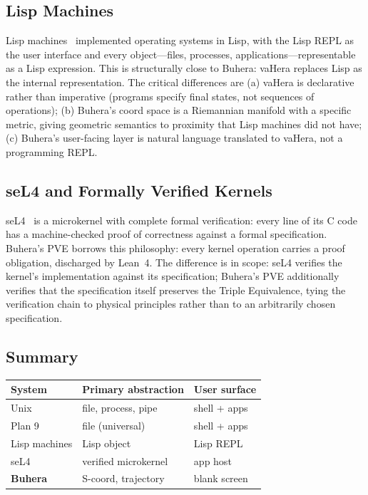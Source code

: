 \documentclass[11pt,twocolumn,a4paper]{article}
\begin{document}
\subsection{Lisp Machines}
Lisp machines~\cite{knight1974cons,bawden1977lisp} implemented operating systems in Lisp, with the Lisp REPL as the user interface and every object---files, processes, applications---representable as a Lisp expression. This is structurally close to Buhera: vaHera replaces Lisp as the internal representation. The critical differences are (a) vaHera is declarative rather than imperative (programs specify final states, not sequences of operations); (b) Buhera's coord space is a Riemannian manifold with a specific metric, giving geometric semantics to proximity that Lisp machines did not have; (c) Buhera's user-facing layer is natural language translated to vaHera, not a programming REPL.

\subsection{seL4 and Formally Verified Kernels}
seL4~\cite{klein2009sel4} is a microkernel with complete formal verification: every line of its C code has a machine-checked proof of correctness against a formal specification. Buhera's PVE borrows this philosophy: every kernel operation carries a proof obligation, discharged by Lean~4. The difference is in scope: seL4 verifies the kernel's implementation against its specification; Buhera's PVE additionally verifies that the specification itself preserves the Triple Equivalence, tying the verification chain to physical principles rather than to an arbitrarily chosen specification.

\subsection{Summary}
\begin{center}
\begin{tabular}{lll}
\toprule
\textbf{System} & \textbf{Primary abstraction} & \textbf{User surface} \\
\midrule
Unix & file, process, pipe & shell + apps \\
Plan 9 & file (universal) & shell + apps \\
Lisp machines & Lisp object & Lisp REPL \\
seL4 & verified microkernel & app host \\
\textbf{Buhera} & S-coord, trajectory & blank screen \\
\bottomrule
\end{tabular}
\end{center}
\end{document}
